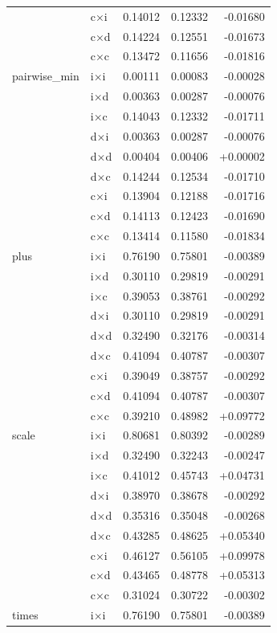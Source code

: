 \begin{longtable}{l l r r r}
   & c×i & 0.14012 & 0.12332 & -0.01680 \\
   & c×d & 0.14224 & 0.12551 & -0.01673 \\
   & c×c & 0.13472 & 0.11656 & -0.01816 \\
\midrule
  pairwise\_min & i×i & 0.00111 & 0.00083 & -0.00028 \\
   & i×d & 0.00363 & 0.00287 & -0.00076 \\
   & i×c & 0.14043 & 0.12332 & -0.01711 \\
   & d×i & 0.00363 & 0.00287 & -0.00076 \\
   & d×d & 0.00404 & 0.00406 & +0.00002 \\
   & d×c & 0.14244 & 0.12534 & -0.01710 \\
   & c×i & 0.13904 & 0.12188 & -0.01716 \\
   & c×d & 0.14113 & 0.12423 & -0.01690 \\
   & c×c & 0.13414 & 0.11580 & -0.01834 \\
\midrule
  plus & i×i & 0.76190 & 0.75801 & -0.00389 \\
   & i×d & 0.30110 & 0.29819 & -0.00291 \\
   & i×c & 0.39053 & 0.38761 & -0.00292 \\
   & d×i & 0.30110 & 0.29819 & -0.00291 \\
   & d×d & 0.32490 & 0.32176 & -0.00314 \\
   & d×c & 0.41094 & 0.40787 & -0.00307 \\
   & c×i & 0.39049 & 0.38757 & -0.00292 \\
   & c×d & 0.41094 & 0.40787 & -0.00307 \\
   & c×c & 0.39210 & 0.48982 & +0.09772 \\
\midrule
  scale & i×i & 0.80681 & 0.80392 & -0.00289 \\
   & i×d & 0.32490 & 0.32243 & -0.00247 \\
   & i×c & 0.41012 & 0.45743 & +0.04731 \\
   & d×i & 0.38970 & 0.38678 & -0.00292 \\
   & d×d & 0.35316 & 0.35048 & -0.00268 \\
   & d×c & 0.43285 & 0.48625 & +0.05340 \\
   & c×i & 0.46127 & 0.56105 & +0.09978 \\
   & c×d & 0.43465 & 0.48778 & +0.05313 \\
   & c×c & 0.31024 & 0.30722 & -0.00302 \\
\midrule
  times & i×i & 0.76190 & 0.75801 & -0.00389 \\

\end{longtable}
